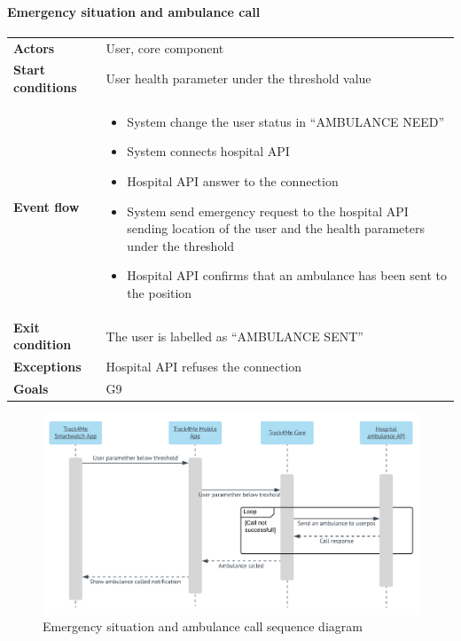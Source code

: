 \paragraph{Emergency situation and ambulance call}
\begin{center}
\begin{table}[H]
\centering
\begin{tabular}{l|p{}}
\textbf{Actors} & User, core component \\
\textbf{Start conditions} & User health parameter under the threshold value \\
\textbf{Event flow}  & \begin{minipage}[t]{0.7\textwidth}
    \begin{itemize}
       \item System change the user status in “AMBULANCE NEED”
\item System connects hospital API 
\item Hospital API answer to the connection
\item System send emergency request to the hospital API sending location of the user and the health parameters under the threshold
\item Hospital API confirms that an ambulance has been sent to the position

    \end{itemize}
    
\end{minipage} \\
\textbf{Exit condition} & The user is labelled as “AMBULANCE SENT” \\
\textbf{Exceptions} & Hospital API refuses the connection \\
\textbf{Goals} & G9 
\end{tabular}

\end{table}
\end{center}
\begin{figure}[H]
  \includegraphics[width=\textwidth,height=\textheight,keepaspectratio]{assets/sequence/EmergencySituationAndAmbulanceCall.pdf}
  \caption{Emergency situation and ambulance call sequence diagram}
  \label{fig:EmergencySituationAndAmbulanceCall}
\end{figure}












